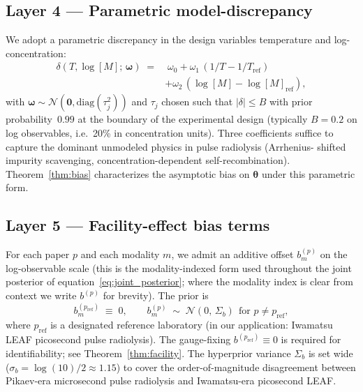 \documentclass[12pt]{article}
\theoremstyle{plain}
\theoremstyle{definition}
\theoremstyle{remark}
\begin{document}
\subsection{Layer 4 --- Parametric model-discrepancy}\label{sec:framework:disc}

We adopt a parametric discrepancy in the design variables temperature and
log-concentration:
%
\begin{equation}
\begin{aligned}
  \delta(T, \log[M];\,\boldsymbol\omega)
    \;=&\; \omega_0 + \omega_1\,(1/T - 1/T_{\mathrm{ref}}) \\
       &+ \omega_2\,(\log[M] - \log[M]_{\mathrm{ref}}),
\end{aligned}
  \label{eq:disc}
\end{equation}
%
with $\boldsymbol\omega \sim \mathcal{N}(\mathbf{0}, \mathrm{diag}(\tau_j^2))$
and $\tau_j$ chosen such that $|\delta| \le B$ with prior probability~$0.99$
at the boundary of the experimental design (typically $B = 0.2$ on log
observables, i.e.\ 20\% in concentration units).  Three coefficients suffice
to capture the dominant unmodeled physics in pulse radiolysis (Arrhenius-
shifted impurity scavenging, concentration-dependent self-recombination).
Theorem~\ref{thm:bias} characterizes the asymptotic bias on
$\boldsymbol\theta$ under this parametric form.

\subsection{Layer 5 --- Facility-effect bias terms}\label{sec:framework:facility}

For each paper $p$ and each modality $m$, we admit an additive offset
$b^{(p)}_m$ on the log-observable scale (this is the modality-indexed form
used throughout the joint posterior of equation~\eqref{eq:joint_posterior};
where the modality index is clear from context we write $b^{(p)}$ for
brevity).  The prior is
%
\begin{equation}
  b^{(p_{\mathrm{ref}})}_m \;\equiv\; 0,
  \qquad
  b^{(p)}_m \;\sim\; \mathcal{N}(0,\,\Sigma_b)
    \ \ \text{for } p\ne p_{\mathrm{ref}},
\end{equation}
%
where $p_{\mathrm{ref}}$ is a designated reference laboratory (in our
application: Iwamatsu LEAF picosecond pulse radiolysis).  The gauge-fixing
$b^{(p_{\mathrm{ref}})} \equiv 0$ is required for identifiability; see
Theorem~\ref{thm:facility}.  The hyperprior variance $\Sigma_b$ is set wide
($\sigma_b = \log(10)/2 \approx 1.15$) to cover the order-of-magnitude
disagreement between Pikaev-era microsecond pulse radiolysis and
Iwamatsu-era picosecond LEAF.
\end{document}
